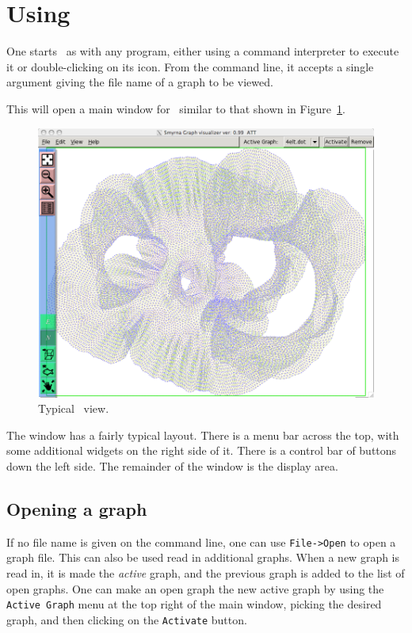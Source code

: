 \section{Using \smyrna} \label{sec:using}

One starts \smyrna\ as with any program, either using a command interpreter to
execute it or double-clicking on its icon. From the command line, 
it accepts a single argument giving the
file name of a graph to be viewed.

This will open a main window for \smyrna\ similar to 
that shown in Figure~\ref{fig:main0}.
\begin{figure}[ht] 
\begin{center}
\includegraphics[scale=.3]{figures/smyrna.png}
\caption{\small Typical \smyrna\ view.}
\label{fig:main0} 
\end{center}
\end{figure}
The window has a fairly typical layout. There is a menu bar across the top,
with some additional widgets on the right side of it. There is a control bar
of buttons down the left side. The remainder of the window is the display area.

\subsection{Opening a graph}
If no file name is given on the command line, one can use 
{\tt File->Open} to open a graph file. This can also be used
read in additional graphs. When a new graph is read in, it is made
the {\it active} graph, and the previous graph is added to the
list of open graphs. One can make an open graph the new active
graph by using the {\tt Active Graph} menu at the top right
of the main window, picking the desired
graph, and then clicking on the {\tt Activate} button.


